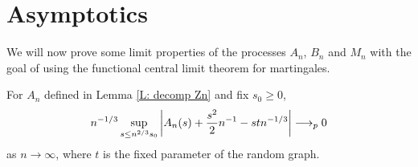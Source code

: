\section{Asymptotics}

We will now prove some limit properties of the processes $A_n$, $B_n$ and $M_n$ with the goal of using the functional central limit theorem for martingales.


\begin{lemma} \label{L: limit An}
	For $A_n$ defined in Lemma \ref{L: decomp Zn} and fix $s_0 \geq 0$,
	\begin{equation} \label{E: limit An}
	n^{-1 / 3} \sup_{s \leq n^{2 / 3} s_0 } \left| A_n(s) + \frac{s^2}{2}n^{-1} - stn^{-1 / 3} \right| \longrightarrow_p 0
	\end{equation}
	as $n \rightarrow \infty$, where $t$ is the fixed parameter of the random graph.
\end{lemma}


